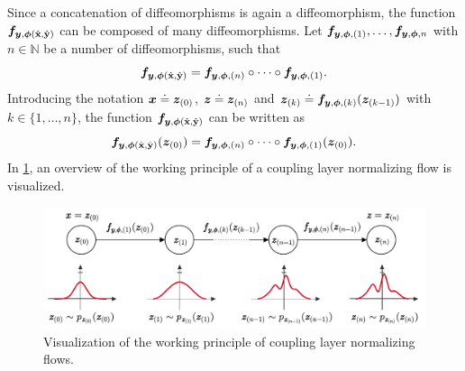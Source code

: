\documentclass[a4paper,12pt]{report}
\begin{document}
Since a concatenation of diffeomorphisms is again a diffeomorphism, the function $\bm{f}_{\bm{y},\bm{\phi}(\hat{\boldsymbol{\mathbf{x}}},\hat{\boldsymbol{\mathbf{y}}})}$ can be composed of many diffeomorphisms. Let $\bm{f}_{\bm{y},\bm{\phi},(1)}, \dots, \bm{f}_{\bm{y},\bm{\phi},n}$ with $n \in \mathbb{N}$ be a number of diffeomorphisms, such that \begin{equation}
\bm{f}_{\bm{y},\bm{\phi}(\hat{\boldsymbol{\mathbf{x}}},\hat{\boldsymbol{\mathbf{y}}})} = \bm{f}_{\bm{y},\bm{\phi},(n)}\circ \dots \circ \bm{f}_{\bm{y},\bm{\phi},(1)}.
\end{equation} Introducing the notation $\bm{x} \doteq \bm{z}_{(0)}$, $\bm{z} \doteq \bm{z}_{(n)}$ and $\bm{z}_{(k)} \doteq \bm{f}_{\bm{y},\bm{\phi},(k)}(\bm{z}_{(k-1)})$ with $k \in \{1,\dots,n\}$, the function $\bm{f}_{\bm{y},\bm{\phi}(\hat{\boldsymbol{\mathbf{x}}},\hat{\boldsymbol{\mathbf{y}}})}$ can be written as \begin{equation}
\bm{f}_{\bm{y},\bm{\phi}(\hat{\boldsymbol{\mathbf{x}}},\hat{\boldsymbol{\mathbf{y}}})}(\bm{z}_{(0)}) = \bm{f}_{\bm{y},\bm{\phi},(n)}\circ \dots\circ \bm{f}_{\bm{y},\bm{\phi},(1)}(\bm{z}_{(0)}).
\end{equation} 
In \cref{fig:normflows}, an overview of the working principle of a coupling layer normalizing flow is visualized.
\begin{figure}[h!]
\centering
\includegraphics[width=\textwidth]{figures/normflows.pdf}
\caption{Visualization of the working principle of coupling layer normalizing flows.}
\label{fig:normflows}
\end{figure}
\end{document}
